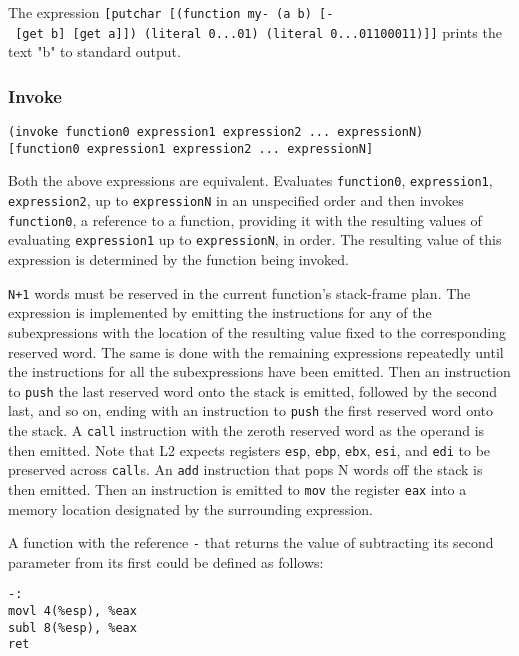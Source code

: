 \documentclass[]{article}
\begin{document}
The expression
\texttt{{[}putchar\ {[}(function\ my-\ (a\ b)\ {[}-\ {[}get\ b{]}\ {[}get\ a{]}{]})\ (literal\ 0...01)\ (literal\ 0...01100011){]}{]}}
prints the text "b" to standard output.

\hypertarget{invoke}{%
\subsubsection{Invoke}\label{invoke}}

\begin{verbatim}
(invoke function0 expression1 expression2 ... expressionN)
[function0 expression1 expression2 ... expressionN]
\end{verbatim}

Both the above expressions are equivalent. Evaluates \texttt{function0},
\texttt{expression1}, \texttt{expression2}, up to \texttt{expressionN}
in an unspecified order and then invokes \texttt{function0}, a reference
to a function, providing it with the resulting values of evaluating
\texttt{expression1} up to \texttt{expressionN}, in order. The resulting
value of this expression is determined by the function being invoked.

\texttt{N+1} words must be reserved in the current function's
stack-frame plan. The expression is implemented by emitting the
instructions for any of the subexpressions with the location of the
resulting value fixed to the corresponding reserved word. The same is
done with the remaining expressions repeatedly until the instructions
for all the subexpressions have been emitted. Then an instruction to
\texttt{push} the last reserved word onto the stack is emitted, followed
by the second last, and so on, ending with an instruction to
\texttt{push} the first reserved word onto the stack. A \texttt{call}
instruction with the zeroth reserved word as the operand is then
emitted. Note that L2 expects registers \texttt{esp}, \texttt{ebp},
\texttt{ebx}, \texttt{esi}, and \texttt{edi} to be preserved across
\texttt{call}s. An \texttt{add} instruction that pops N words off the
stack is then emitted. Then an instruction is emitted to \texttt{mov}
the register \texttt{eax} into a memory location designated by the
surrounding expression.

A function with the reference \texttt{-} that returns the value of
subtracting its second parameter from its first could be defined as
follows:

\begin{verbatim}
-:
movl 4(%esp), %eax
subl 8(%esp), %eax
ret
\end{verbatim}
\end{document}
